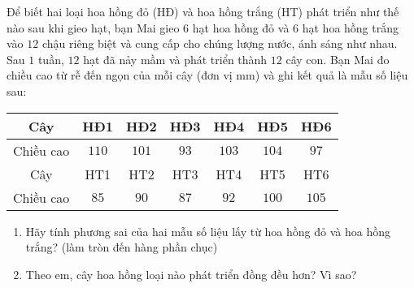 \begin{bt}%
Để biết hai loại hoa hồng đỏ (HĐ) và hoa hồng trắng (HT) phát triển như thế nào sau khi gieo hạt, bạn Mai gieo $6$ hạt hoa hồng đỏ và $6$ hạt hoa hồng trắng vào $12$ chậu riêng biệt và cung cấp cho chúng lượng nước, ánh sáng như nhau. Sau $1$ tuần, $12$ hạt đã nảy mầm và phát triển thành $12$ cây con. Bạn Mai đo chiều cao từ rễ đến ngọn của mỗi cây (đơn vị mm) và ghi kết quả là mẫu số liệu sau:
\begin{center}
	\begin{tabular}{|c|c|c|c|c|c|c|}
		\hline
		Cây& HĐ1 & HĐ2 & HĐ3 & HĐ4 & HĐ5 & HĐ6 \\ 
		\hline
	Chiều cao	& $110$  & $101$  & $93$ & $103$ & $104$ & $97$ \\ 
		\hline
	Cây	& HT1 & HT2 & HT3 & HT4 & HT5 & HT6 \\ 
		\hline
	Chiều cao	& $85$ & $90$ & $87$ & $92$ &$100$  & $105$ \\ 
		\hline
	\end{tabular}
\end{center}
	\begin{enumerate}
		\item Hãy tính phương sai của hai mẫu số liệu lấy từ hoa hồng đỏ và hoa hồng trắng? (làm tròn đến hàng phần chục)
		\item Theo em, cây hoa hồng loại nào phát triển đồng đều hơn? Vì sao?
	\end{enumerate}
\end{bt}

